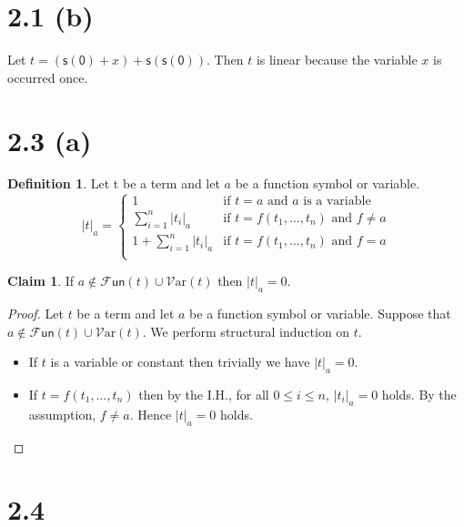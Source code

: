 \documentclass[autodetect-enginem]{article}
\title{}
\author{}
\date{}
\newcommand{\FF}{\mathcal{F}}
\newcommand{\Var}{\mathcal{V}\mathrm{ar}}
\theoremstyle{plain}
\theoremstyle{definition}
\newtheorem*{definition*}{Definition}
\theoremstyle{definition}
\newtheorem*{claim}{Claim}
\newcommand{\m}[1]{\mathsf{#1}}
\newcommand{\Fun}{\FF\mathsf{un}}
\begin{document}
\section*{2.1 (b)}

Let $t = (\m{s}(\m{0}) + x) + \m{s}(\m{s}(\m{0}))$.
Then $t$ is linear because the variable $x$ is occurred once.

\section*{2.3 (a)}

\begin{definition*}
    Let t be a term and let $a$ be a function symbol or variable.
    \[
        |t|_a = \begin{cases}
            1 & \text{if $t = a$ and $a$ is a variable}\\
            \sum\limits_{i = 1}^n |t_i|_a & \text{if $t = f(t_1,\dots,t_n)$ and $f \neq a$}\\
            1 + \sum\limits_{i = 1}^n |t_i|_a & \text{if $t = f(t_1,\dots,t_n)$ and $f = a$}\\
        \end{cases}
    \]
\end{definition*}

\begin{claim}
    If $a \notin \Fun(t) \cup \Var(t)$ then $|t|_a = 0$.
\end{claim}

\begin{proof}
    Let $t$ be a term and let $a$ be a function symbol or variable.
    Suppose that $a \notin \Fun(t) \cup \Var(t)$.
    We perform structural induction on $t$.
    \begin{itemize}
        \item If $t$ is a variable or constant then trivially we have $|t|_a = 0$. 
        \item If $t = f(t_1,\dots,t_n)$ then by the I.H., for all $0 \leq i \leq n$, $|t_i|_a = 0$ holds.
              By the assumption, $f \neq a$. Hence $|t|_a = 0$ holds.
    \end{itemize}
\end{proof}

\newcommand{\Pos}{\mathcal{P}\mathsf{os}}

\section*{2.4}
\end{document}
